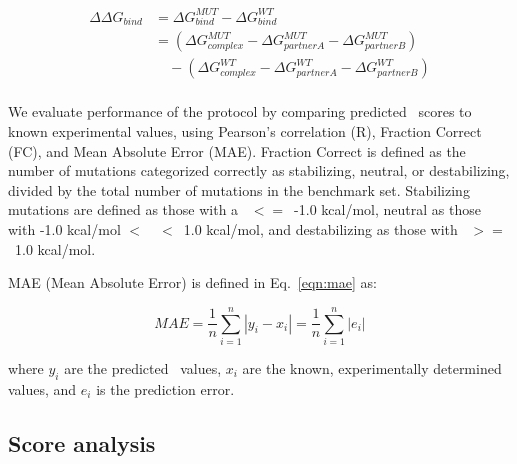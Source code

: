 \begin{equation}\label{eqn:split-ddg}
  \begin{split}
    {\Delta\Delta}G_{bind} & ={\Delta}G^{MUT}_{bind} - {\Delta}G^{WT}_{bind}\\
    & =({\Delta}G^{MUT}_{complex} - {\Delta}G^{MUT}_{partner A} - {\Delta}G^{MUT}_{partner B})\\
    & \quad - ({\Delta}G^{WT}_{complex} - {\Delta}G^{WT}_{partner A} - {\Delta}G^{WT}_{partner B})\\
  \end{split}
\end{equation}

We evaluate performance of the protocol by comparing predicted \ddg\ scores to known experimental values, using Pearson's correlation (R), Fraction Correct (FC), and Mean Absolute Error (MAE). Fraction Correct is defined as the number of mutations categorized correctly as stabilizing, neutral, or destabilizing, divided by the total number of mutations in the benchmark set. Stabilizing mutations are defined as those with a \ddg\ $<=$\ -1.0 kcal/mol, neutral as those with -1.0 kcal/mol $<$\ \ddg\ $<$\ 1.0 kcal/mol, and destabilizing as those with \ddg\ $>=$\ 1.0 kcal/mol.

MAE (Mean Absolute Error) is defined in Eq.~\ref{eqn:mae} as:

\begin{equation}\label{eqn:mae}
  MAE = \dfrac{1}{n}\sum\limits_{i=1}^n|y_i-x_i| = \dfrac{1}{n}\sum\limits_{i=1}^n|e_i|
\end{equation}

where $y_i$ are the predicted \ddg\ values, $x_i$ are the known, experimentally determined values, and $e_i$ is the prediction error.

\subsection{Score analysis}

